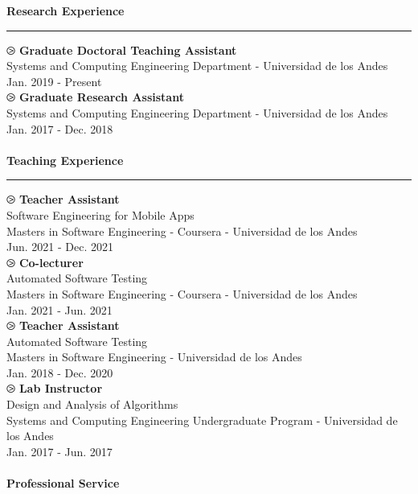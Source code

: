 \documentclass[letterpaper,11pt,oneside]{article}
\begin{document}
\noindent \Large{\textbf{Research Experience}} \\
\vspace{-2ex}
\hrule 
\normalsize
\vspace{2ex}
\noindent $\ogreaterthan$ \textbf{Graduate Doctoral Teaching Assistant} \\
	Systems and Computing Engineering Department - Universidad de los Andes \\
	Jan. 2019 - Present\\
\noindent $\ogreaterthan$ \textbf{Graduate Research Assistant} \\
Systems and Computing Engineering Department - Universidad de los Andes \\
Jan. 2017 - Dec. 2018\\
\\
\newpage
\noindent \Large{\textbf{Teaching Experience}} \\
\vspace{-2ex}
\hrule 
\normalsize
\vspace{2ex}
\noindent $\ogreaterthan$ \textbf{Teacher Assistant} \\
Software Engineering for Mobile Apps \\
Masters in Software Engineering - Coursera - Universidad de los Andes \\
Jun. 2021 - Dec. 2021\\
\noindent $\ogreaterthan$ \textbf{Co-lecturer} \\
Automated Software Testing \\
Masters in Software Engineering - Coursera - Universidad de los Andes \\
Jan. 2021 - Jun. 2021\\
\noindent $\ogreaterthan$ \textbf{Teacher Assistant} \\
Automated Software Testing \\
Masters in Software Engineering - Universidad de los Andes \\
Jan. 2018 - Dec. 2020\\
\noindent $\ogreaterthan$ \textbf{Lab Instructor} \\
Design and Analysis of Algorithms \\
Systems and Computing Engineering Undergraduate Program - Universidad de los Andes \\
Jan. 2017 - Jun. 2017\\
\\
\noindent \Large{\textbf{Professional Service}} \\
\vspace{-2ex}
\end{document}
